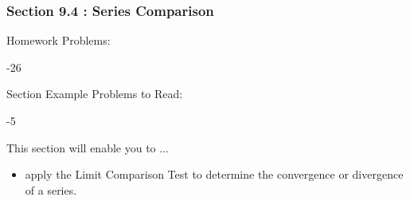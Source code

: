 %
%

\begin{frame}
\frametitle{\Large {\color[rgb]{0.02,0.20,1.0} Section 9.4 : Series Comparison}}
\scriptsize
\vspace{0.8cm}
\begin{block}{Homework Problems:}

\vspace{0.2cm}
-26
	
\end{block}
\vspace{0.5cm}
\begin{block}{Section Example Problems to Read:}

\vspace{0.2cm}
-5
\end{block}
\vspace{0.5cm}
\begin{block}{This section will enable you to ...}
\begin{itemize}
	\item[...] apply the Limit Comparison Test to determine the convergence or divergence of a series.
\end{itemize}
\end{block}
\vspace{3.0cm}
\end{frame}

